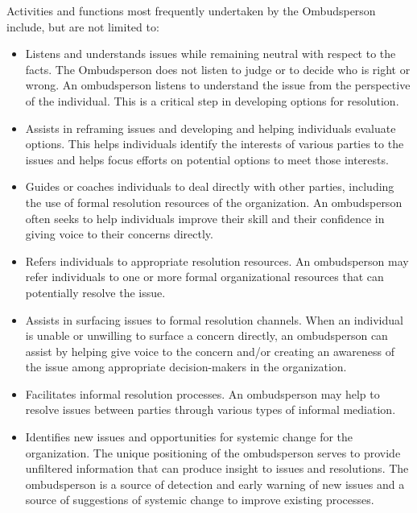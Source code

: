 \documentclass[12pt]{article}
\begin{document}
Activities and functions most frequently undertaken by the Ombudsperson include, but are not limited to:
\begin{itemize}
\item Listens and understands issues while remaining neutral with respect to the facts. The Ombudsperson does not listen to judge or to decide who is right or wrong. An ombudsperson listens to understand the issue from the perspective of the individual. This is a critical step in developing options for resolution.
\item Assists in reframing issues and developing and helping individuals evaluate options. This helps individuals identify the interests of various parties to the issues and helps focus efforts on potential options to meet those interests.
\item Guides or coaches individuals to deal directly with other parties, including the use of formal resolution resources of the organization. An ombudsperson often seeks to help individuals improve their skill and their confidence in giving voice to their concerns directly.
\item Refers individuals to appropriate resolution resources. An ombudsperson may refer individuals to one or more formal organizational resources that can potentially resolve the issue.
\item Assists in surfacing issues to formal resolution channels. When an individual is unable or unwilling to surface a concern directly, an ombudsperson can assist by helping give voice to the concern and/or creating an awareness of the issue among appropriate decision-makers in the organization.
\item Facilitates informal resolution processes. An ombudsperson may help to resolve issues between parties through various types of informal mediation.
\item Identifies new issues and opportunities for systemic change for the organization. The unique positioning of the ombudsperson serves to provide unfiltered information that can produce insight to issues and resolutions. The ombudsperson is a source of detection and early warning of new issues and a source of suggestions of systemic change to improve existing processes.
\end{itemize}
\end{document}
